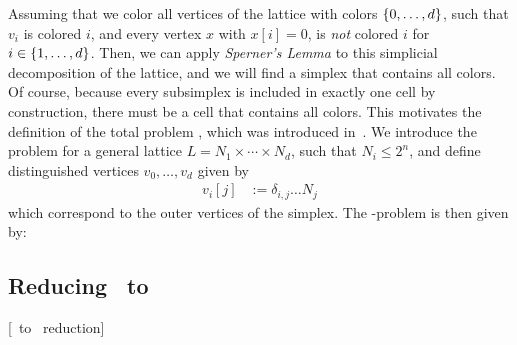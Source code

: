Assuming that we color all vertices of the lattice with colors $\left\{0, \dots, d\right\}$, such that $v_i$ is colored $i$, and every vertex $x$ with $x[i] = 0$, is \textit{not} colored $i$ for $i \in \left\{1, \dots, d\right\}$. Then, we can apply \textit{Sperner's Lemma} to this simplicial decomposition of the lattice, and we will find a simplex that contains all colors. Of course, because every subsimplex is included in exactly one cell by construction, there must be a cell that contains all colors. This motivates the definition of the total problem \Sperner, which was introduced in~. We introduce the problem for a general lattice $L = N_1 \times \cdots \times N_d$, such that $N_i \leq 2^n$, and define distinguished vertices $v_0, \dots, v_d$ given by
\begin{align*}
	v_i[j] & := \delta_{i, j} \dots N_j
\end{align*}
which correspond to the outer vertices of the simplex. The \Sperner-problem is then given by:


\subsection{Reducing \Sperner\ to \EndOfLine}[\Sperner\ to \EndOfLine\ reduction]\label{sec:sperner_eol_reduction}

